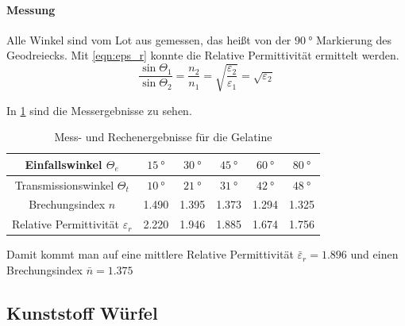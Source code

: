 \documentclass[colorlinks = true, allcolors = black, ngerman, 11pt,
a4paper, twoside, titlepage]{article}
\numberwithin{figure}{section}
\renewcommand{\si}[2]{\SI{#1}{#2}}
\begin{document}
	
	
	\paragraph{Messung}
	
	Alle Winkel sind vom Lot aus gemessen, das heißt von der
	\(\si{90}{\degree}\) Markierung des Geodreiecks.
	Mit \cref{eqn:eps_r} konnte die Relative Permittivität ermittelt werden.
	\begin{equation} \label{eqn:eps_r}
		\frac{\sin\Theta_{1}}{\sin\Theta_{2}} = \frac{n_{2}}{n_{1}} =
		\sqrt{\frac{\varepsilon_{2}}{\varepsilon_{1}}}=\sqrt{\varepsilon_{2}}
	\end{equation}
	
	
	
	In \cref{tab:gelatine-messergebnisse} sind die Messergebnisse zu sehen.
	\begin{table} [h]
		\centering
		\begin{tabular}{|c|c|c|c|c|c|}
			\hline
			Einfallswinkel $\Theta_{e}$ & $\si{15}{\degree}$ &
			$\si{30}{\degree}$ & $\si{45}{\degree}$ & $\si{60}{\degree}$ &
			$\si{80}{\degree}$ \\
			\hline
			Transmissionswinkel $\Theta_{t}$ & $\si{10}{\degree}$ &
			$\si{21}{\degree}$ & $\si{31}{\degree}$ & $\si{42}{\degree}$ &
			$\si{48}{\degree}$ \\
			\hline
			Brechungsindex $n$ & 1.490 & 1.395 & 1.373 & 1.294 & 1.325 \\
			\hline
			Relative Permittivität $\varepsilon_{r}$ & 2.220 & 1.946 & 1.885
			& 1.674 & 1.756 \\
			\hline
		\end{tabular}
		\caption{Mess- und Rechenergebnisse für die Gelatine}
		\label{tab:gelatine-messergebnisse}
	\end{table}
	
	Damit kommt man auf eine mittlere Relative Permittivität
	$\bar{\varepsilon}_{r} = 1.896$ und einen Brechungsindex $\bar{n} = 1.375$
	
	
	\subsection{Kunststoff Würfel}
\end{document}
